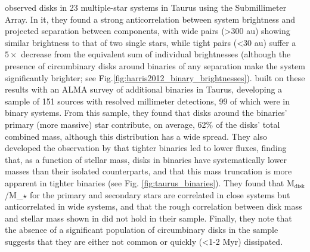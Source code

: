 \citet{Harris2012} observed disks in 23 multiple-star systems in Taurus using the Submillimeter Array. In it, they found a strong anticorrelation between system brightness and projected separation between components, with wide pairs (\textgreater300 au) showing similar brightness to that of two single stars, while tight pairs (\textless30 au) suffer a $5\times$ decrease from the equivalent sum of individual brightnesses (although the presence of circumbinary disks around binaries of any separation make the system significantly brighter; see Fig.\ref{fig:harris2012_binary_brightnesses}). \citet{Akeson2019} built on these results with an ALMA survey of additional binaries in Taurus, developing a sample of 151 sources with resolved millimeter detections, 99 of which were in binary systems. From this sample, they found that disks around the binaries' primary (more massive) star contribute, on average, 62\% of the disks' total combined mass, although this distribution has a wide spread. They also developed the observation by \citet{Harris2012} \citep[and previously in][]{Jensen1996} that tighter binaries led to lower fluxes, finding that, as a function of stellar mass, disks in binaries have systematically lower masses than their isolated counterparts, and that this mass truncation is more apparent in tighter binaries (see Fig. \ref{fig:taurus_binaries}). They found that M$_\text{disk}$/M_$\star$ for the primary and secondary stars are correlated in close systems but anticorrelated in wide systems, and that the rough correlation between disk mass and stellar mass shown in \citet{Andrews2013} did not hold in their sample. Finally, they note that the absence of a significant population of circumbinary disks in the sample suggests that they are either not common or quickly (\textless1-2 Myr) dissipated.




